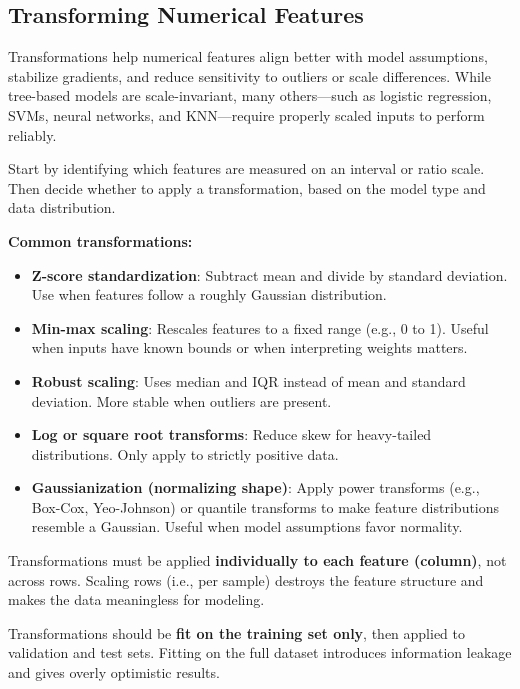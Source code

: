 \documentclass[12pt,openany]{book}
\begin{document}
\subsection{Transforming Numerical Features}

Transformations help numerical features align better with model assumptions, stabilize gradients, and reduce sensitivity to outliers or scale differences. While tree-based models are scale-invariant, many others—such as logistic regression, SVMs, neural networks, and KNN—require properly scaled inputs to perform reliably.
\newline

Start by identifying which features are measured on an interval or ratio scale. Then decide whether to apply a transformation, based on the model type and data distribution.
\newline

\textbf{Common transformations:}
\begin{itemize}
    \item \textbf{Z-score standardization}: Subtract mean and divide by standard deviation. Use when features follow a roughly Gaussian distribution.
    \item \textbf{Min-max scaling}: Rescales features to a fixed range (e.g., 0 to 1). Useful when inputs have known bounds or when interpreting weights matters.
    \item \textbf{Robust scaling}: Uses median and IQR instead of mean and standard deviation. More stable when outliers are present.
    \item \textbf{Log or square root transforms}: Reduce skew for heavy-tailed distributions. Only apply to strictly positive data.
    \item \textbf{Gaussianization (normalizing shape)}: Apply power transforms (e.g., Box-Cox, Yeo-Johnson) or quantile transforms to make feature distributions resemble a Gaussian. Useful when model assumptions favor normality.
\end{itemize}

\begin{notebox}
Transformations must be applied \textbf{individually to each feature (column)}, not across rows. Scaling rows (i.e., per sample) destroys the feature structure and makes the data meaningless for modeling. 
\end{notebox}

\begin{notebox}
Transformations should be \textbf{fit on the training set only}, then applied to validation and test sets. Fitting on the full dataset introduces information leakage and gives overly optimistic results.
\end{notebox}
\end{document}
